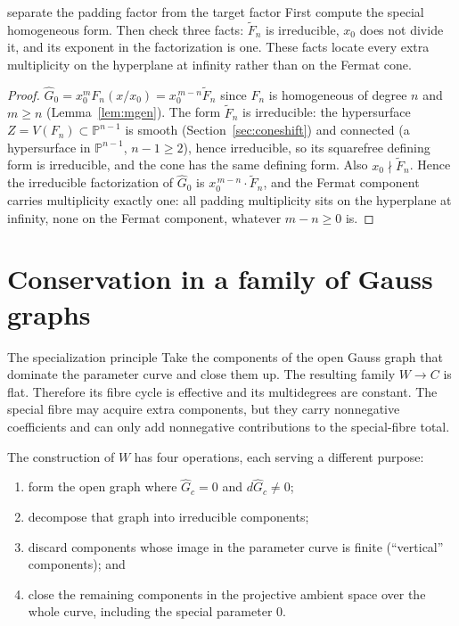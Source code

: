 \documentclass[acmsmall,screen,nonacm]{acmart}
\theoremstyle{definition}
\theoremstyle{remark}
\newcommand{\PP}{\mathbb{P}}
\begin{document}
\begin{roadmapbox}{separate the padding factor from the target factor}
First compute the special homogeneous form.  Then check three facts:
$\widetilde F_n$ is irreducible, $x_0$ does not divide it, and its exponent in
the factorization is one.  These facts locate every extra multiplicity on the
hyperplane at infinity rather than on the Fermat cone.
\end{roadmapbox}

\begin{proof}
$\widehat G_0=x_0^mF_n(x/x_0)=x_0^{\,m-n}\widetilde F_n$ since $F_n$
is homogeneous of degree $n$ and $m\ge n$
(Lemma~\ref{lem:mgen}).  The form $\widetilde F_n$ is irreducible: the
hypersurface $Z=V(F_n)\subset\PP^{n-1}$ is smooth
(Section~\ref{sec:coneshift}) and connected (a hypersurface in
$\PP^{n-1}$, $n-1\ge2$), hence irreducible, so its squarefree defining
form is irreducible, and the cone has the same defining form.  Also
$x_0\nmid\widetilde F_n$.  Hence the irreducible factorization of
$\widehat G_0$ is $x_0^{\,m-n}\cdot\widetilde F_n$, and the Fermat
component carries multiplicity exactly one: all padding multiplicity
sits on the hyperplane at infinity, none on the Fermat component,
whatever $m-n\ge0$ is.
\end{proof}

\section{Conservation in a family of Gauss graphs}
\label{sec:family}

\begin{readerbox}{The specialization principle}
Take the components of the open Gauss graph that dominate the parameter curve and close them up.  The resulting family $W\to C$ is flat.  Therefore its fibre cycle is effective and its multidegrees are constant.  The special fibre may acquire extra components, but they carry nonnegative coefficients and can only add nonnegative contributions to the special-fibre total.
\end{readerbox}

The construction of $W$ has four operations, each serving a different purpose:
\begin{enumerate}[leftmargin=2.2em,itemsep=2pt]
\item form the open graph where $\widehat G_c=0$ and
$d\widehat G_c\ne0$;
\item decompose that graph into irreducible components;
\item discard components whose image in the parameter curve is finite
(``vertical'' components); and
\item close the remaining components in the projective ambient space over the
whole curve, including the special parameter $0$.
\end{enumerate}
\end{document}
